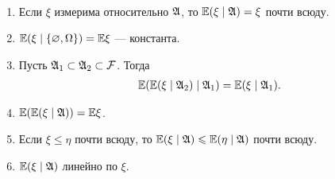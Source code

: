 \documentclass[../main.tex]{subfiles}
\begin{document}
\begin{prop}[свойства]\
 \begin{enumerate}
  \item Если $ \xi $ измерима относительно $ \mathfrak A $, то $ \mathbb E(\xi \mid \mathfrak A) = \xi $ почти всюду.
  \item $ \mathbb E(\xi\mid \left\{ \varnothing,\Omega \right\}) = \mathbb E \xi $ --- константа.
  \item Пусть $ \mathfrak A_1 \subset \mathfrak A_2 \subset \mathcal F $. Тогда
   \begin{align*}
    \mathbb E(\mathbb E(\xi \mid \mathfrak A_2) \mid \mathfrak A_1) = \mathbb E(\xi \mid \mathfrak A_1).
   \end{align*}
  \item $ \mathbb E(\mathbb E(\xi \mid \mathfrak A)) = \mathbb E \xi $.
  \item Если $ \xi \leqslant \eta $ почти всюду, то $ \mathbb E(\xi \mid \mathfrak A) \leqslant \mathbb E(\eta \mid \mathfrak A) $ почти всюду.
  \item $ \mathbb E(\xi \mid \mathfrak A) $ линейно по $ \xi $.
 \end{enumerate}
\end{prop}
\end{document}
